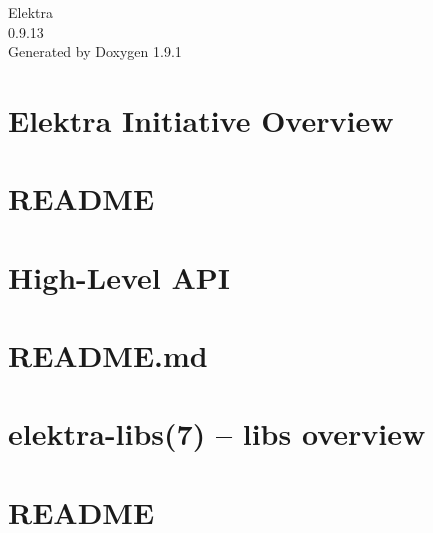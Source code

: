 \let\mypdfximage\pdfximage\def\pdfximage{\immediate\mypdfximage}\documentclass[twoside]{book}
\newcommand{\+}{\discretionary{\mbox{\scriptsize$\hookleftarrow$}}{}{}}
\newcommand{\clearemptydoublepage}{%
  \newpage{\pagestyle{empty}\cleardoublepage}%
}
\begin{document}
\raggedbottom

\hypersetup{pageanchor=false,
             bookmarksnumbered=true,
             pdfencoding=unicode
            }
\begin{titlepage}
\vspace*{7cm}
\begin{center}%
{\Large Elektra \\[1ex]\large 0.\+9.\+13 }\\
\vspace*{1cm}
{\large Generated by Doxygen 1.9.1}\\
\end{center}
\end{titlepage}
\clearemptydoublepage
{}
\tableofcontents
\clearemptydoublepage
{}
\hypersetup{pageanchor=true}

\chapter{Elektra Initiative Overview}
\label{index}\hypertarget{index}{}
\chapter{README}
\label{md_src_libs_elektra_README}

\chapter{High-\/\+Level API}
\label{src_libs_highlevel_README_md}

\chapter{README.\+md}
\label{src_libs_merge_README_md}

\chapter{elektra-\/libs(7) -- libs overview}
\label{src_libs_README_md}

\chapter{README}
\label{md_src_libs_template_README}

\end{document}
